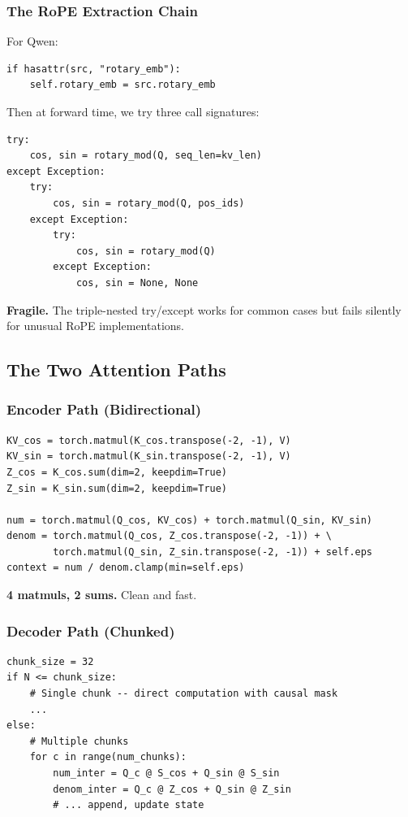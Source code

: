 \subsubsection{The RoPE Extraction Chain}

For Qwen:

\begin{lstlisting}
if hasattr(src, "rotary_emb"):
    self.rotary_emb = src.rotary_emb
\end{lstlisting}

Then at forward time, we try three call signatures:

\begin{lstlisting}
try:
    cos, sin = rotary_mod(Q, seq_len=kv_len)
except Exception:
    try:
        cos, sin = rotary_mod(Q, pos_ids)
    except Exception:
        try:
            cos, sin = rotary_mod(Q)
        except Exception:
            cos, sin = None, None
\end{lstlisting}

\textbf{Fragile.} The triple-nested try/except works for common cases but fails 
silently for unusual RoPE implementations.

\subsection{The Two Attention Paths}

\subsubsection{Encoder Path (Bidirectional)}

\begin{lstlisting}
KV_cos = torch.matmul(K_cos.transpose(-2, -1), V)
KV_sin = torch.matmul(K_sin.transpose(-2, -1), V)
Z_cos = K_cos.sum(dim=2, keepdim=True)
Z_sin = K_sin.sum(dim=2, keepdim=True)

num = torch.matmul(Q_cos, KV_cos) + torch.matmul(Q_sin, KV_sin)
denom = torch.matmul(Q_cos, Z_cos.transpose(-2, -1)) + \
        torch.matmul(Q_sin, Z_sin.transpose(-2, -1)) + self.eps
context = num / denom.clamp(min=self.eps)
\end{lstlisting}

\textbf{4 matmuls, 2 sums.} Clean and fast.

\subsubsection{Decoder Path (Chunked)}

\begin{lstlisting}
chunk_size = 32
if N <= chunk_size:
    # Single chunk -- direct computation with causal mask
    ...
else:
    # Multiple chunks
    for c in range(num_chunks):
        num_inter = Q_c @ S_cos + Q_sin @ S_sin
        denom_inter = Q_c @ Z_cos + Q_sin @ Z_sin
        # ... append, update state
\end{lstlisting}

